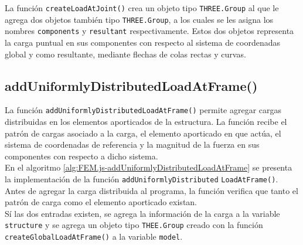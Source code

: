 La función \verb|createLoadAtJoint()| crea un objeto tipo \verb|THREE.Group| al que le agrega dos objetos también tipo \verb|THREE.Group|, a los cuales se les asigna los nombres \verb|components| y \verb|resultant| respectivamente. Estos dos objetos representa la carga puntual en sus componentes con respecto al sistema de coordenadas global y como resultante, mediante flechas de colas rectas y curvas.\\

\subsection{addUniformlyDistributedLoadAtFrame()}

La función \verb|addUniformlyDistributedLoadAtFrame()| permite agregar cargas distribuidas en los elementos aporticados de la estructura. La función recibe el patrón de cargas asociado a la carga, el elemento aporticado en que actúa, el sistema de coordenadas de referencia y la magnitud de la fuerza en sus componentes con respecto a dicho sistema.\\

En el algoritmo \ref{alg:FEM.js-addUniformlyDistributedLoadAtFrame} se presenta la implementación de la función \verb|addUniformlyDistributed| \verb|LoadAtFrame()|. Antes de agregar la carga distribuida al programa, la función verifica que tanto el patrón de carga como el elemento aporticado existan.\\

Sí las dos entradas existen, se agrega la información de la carga a la variable \verb|structure| y se agrega un objeto tipo \verb|THEE.Group| creado con la función \verb|createGlobalLoadAtFrame()| a la variable \verb|model|.\\


